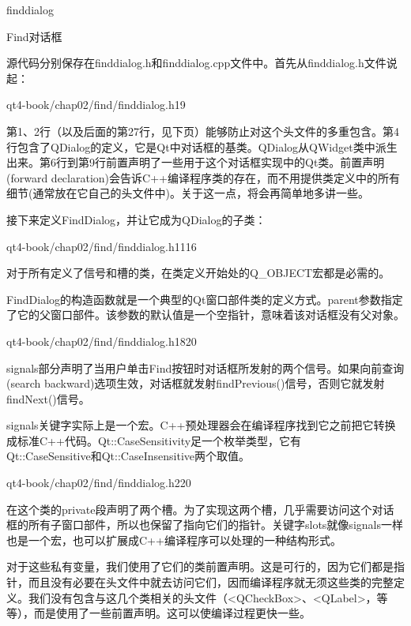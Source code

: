 \documentclass[11pt,oneside]{book}
\begin{document}
\begin{common-format}
\begin{fig}{finddialog}
\caption{Find对话框}
\label{fig:finddialog}
\end{fig}

源代码分别保存在finddialog.h和finddialog.cpp文件中。首先从finddialog.h文件说起：
\begin{cppline}{qt4-book/chap02/find/finddialog.h}{1}{9}
\end{cppline}


第1、2行（以及后面的第27行，见下页）能够防止对这个头文件的多重包含。第4行包含了QDialog的定义，它是Qt中对话框的基类。QDialog从QWidget类中派生出来。第6行到第9行前置声明了一些用于这个对话框实现中的Qt类。前置声明(forward declaration)会告诉C++编译程序类的存在，而不用提供类定义中的所有细节(通常放在它自己的头文件中)。关于这一点，将会再简单地多讲一些。

接下来定义FindDialog，并让它成为QDialog的子类：
\begin{cppline}{qt4-book/chap02/find/finddialog.h}{11}{16}
\end{cppline}


对于所有定义了信号和槽的类，在类定义开始处的Q\_{}OBJECT宏都是必需的。

FindDialog的构造函数就是一个典型的Qt窗口部件类的定义方式。parent参数指定了它的父窗口部件。该参数的默认值是一个空指针，意味着该对话框没有父对象。
\begin{cppline}{qt4-book/chap02/find/finddialog.h}{18}{20}
\end{cppline}

signals部分声明了当用户单击Find按钮时对话框所发射的两个信号。如果向前查询(search backward)选项生效，对话框就发射findPrevious()信号，否则它就发射findNext()信号。

signals关键字实际上是一个宏。C++预处理器会在编译程序找到它之前把它转换成标准C++代码。Qt::CaseSensitivity足一个枚举类型，它有\\ Qt::CaseSensitive和Qt::CaseInsensitive两个取值。
\begin{cppline}{qt4-book/chap02/find/finddialog.h}{22}{0}
\end{cppline}

在这个类的private段声明了两个槽。为了实现这两个槽，几乎需要访问这个对话框的所有子窗口部件，所以也保留了指向它们的指针。关键字slots就像signals一样也是一个宏，也可以扩展成C++编译程序可以处理的一种结构形式。

对于这些私有变量，我们使用了它们的类前置声明。这是可行的，因为它们都是指针，而且没有必要在头文件中就去访问它们，因而编译程序就无须这些类的完整定义。我们没有包含与这几个类相关的头文件（<QCheckBox>、<QLabel>，等等），而是使用了一些前置声明。这可以使编译过程更快一些。


\end{common-format}
\end{document}
